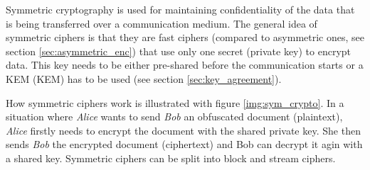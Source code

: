 Symmetric cryptography is used for maintaining confidentiality of the data that is being transferred over a communication medium. The general idea of symmetric ciphers is that they are fast ciphers (compared to asymmetric ones, see section \ref{sec:asymmetric_enc}) that use only one secret (private key) to encrypt data. This key needs to be either pre-shared before the communication starts or a KEM ({\acl{KEM}}) has to be used (see section \ref{sec:key_agreement}). \cite{Ristic2014}

How symmetric ciphers work is illustrated with figure \ref{img:sym_crypto}. In a situation where \textit{Alice} wants to send \textit{Bob} an obfuscated document (plaintext), \textit{Alice} firstly needs to encrypt the document with the shared private key. She then sends \textit{Bob} the encrypted document (ciphertext) and Bob can decrypt it agin with a shared key. Symmetric ciphers can be split into block and stream ciphers.



